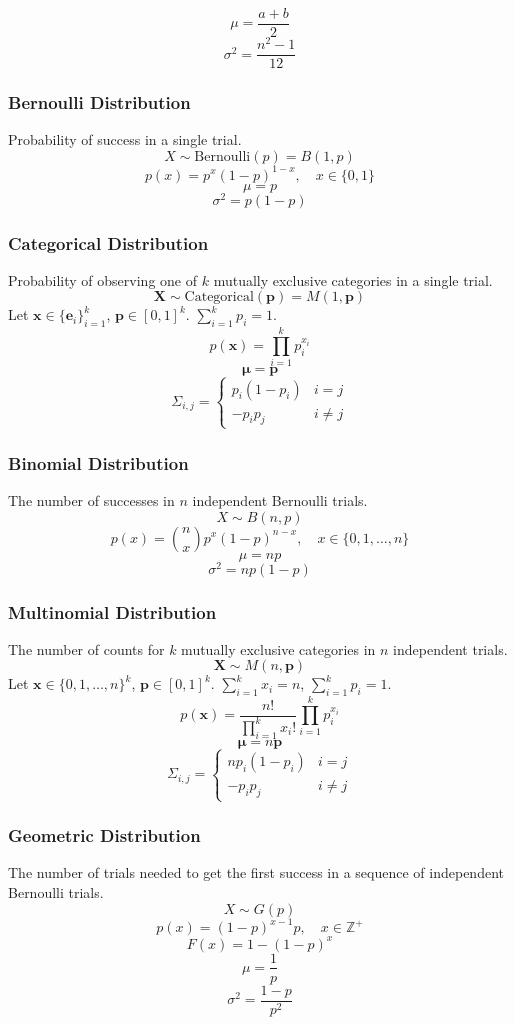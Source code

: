\documentclass{article}
\begin{document}
\[
    \mu = \frac{a + b}{2}
\]
\[
    \sigma^2 = \frac{n^2 - 1}{12}
\]

\subsubsection{Bernoulli Distribution}
Probability of success in a single trial.
\[ X \sim \text{Bernoulli}(p) = B(1,p)\]
\[ p(x) = p^x (1-p)^{1-x}, \quad x \in \{0,1\} \]
\[ \mu = p \]
\[ \sigma^2 = p(1-p) \]

\subsubsection{Categorical Distribution}
Probability of observing one of $k$ mutually exclusive categories in a single trial.
\[ \mathbf{X} \sim \text{Categorical}(\mathbf{p}) = M(1, \mathbf{p})\]
Let $\mathbf{x} \in \{\mathbf{e}_i\}_{i=1}^{k}$, $\mathbf{p} \in [0,1]^k$. $\displaystyle \sum_{i=1}^{k} p_i = 1$.
\[ p(\mathbf{x}) = \prod_{i=1}^{k} p_i^{x_i} \]
\[ \boldsymbol{\mu} = \mathbf{p} \]
\[ \Sigma_{i,j} = \begin{cases} p_i(1-p_i) & i=j \\ -p_i p_j & i \neq j \end{cases} \]

\subsubsection{Binomial Distribution}
The number of successes in $n$ independent Bernoulli trials.
\[ X \sim B(n,p) \]
\[ p(x) = \binom{n}{x} p^x (1-p)^{n-x}, \quad x \in \{0,1,\dots,n\} \]
\[ \mu = np \]
\[ \sigma^2 = np(1-p) \]

\subsubsection{Multinomial Distribution}
The number of counts for $k$ mutually exclusive categories in $n$ independent trials.
\[ \mathbf{X} \sim M(n, \mathbf{p}) \]
Let $\mathbf{x} \in \{0,1,\dots,n\}^k$, $\mathbf{p} \in [0,1]^k$. $\displaystyle \sum_{i=1}^{k} x_i = n$, $\displaystyle \sum_{i=1}^{k} p_i = 1$.
\[ p(\mathbf{x}) = \frac{n!}{\prod_{i=1}^{k} x_i!} \prod_{i=1}^{k} p_i^{x_i} \]
\[ \mathbf{\mu} = n \mathbf{p} \]
\[ \Sigma_{i,j} = \begin{cases} n p_i (1 - p_i) & i=j \\ -p_i p_j & i \neq j \end{cases} \]

\subsubsection{Geometric Distribution}
The number of trials needed to get the first success in a sequence of independent Bernoulli trials.
\[ X \sim G(p) \]
\[ p(x) = (1-p)^{x-1}p, \quad x \in \mathbb{Z}^+ \]
\[ F(x) = 1 - (1-p)^x \]
\[ \mu = \frac{1}{p} \]
\[ \sigma^2 = \frac{1-p}{p^2} \]
\end{document}
